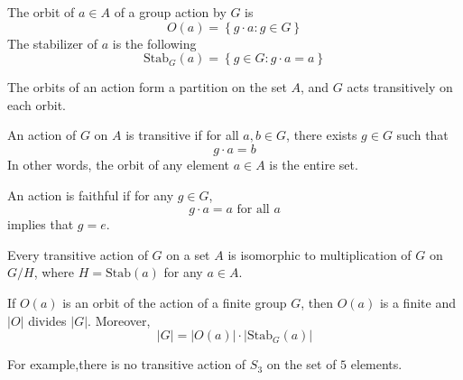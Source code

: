 \documentclass[openany]{book}
\begin{document}
\begin{defn}[orbit]
    The orbit of $a\in A$ of a group action by $G$ is 
    \begin{equation*}
        O(a)=\left\{g\cdot a: g\in G\right\}
    \end{equation*}
    The stabilizer of $a$ is the following 
    \begin{equation*}
        \text{Stab}_G(a)=\left\{g\in G: g\cdot a=a\right\}
    \end{equation*}
\end{defn}

\begin{prop}
    The orbits of an action form a partition on the set $A$, and $G$ acts transitively on each orbit.
\end{prop}

\begin{defn}




    An action of $G$ on $A$ is transitive if for all $a,b\in G$, there exists $g\in G$ such that 
    \begin{equation*}
        g\cdot a=b
    \end{equation*}
    In other words, the orbit of any element $a\in A$ is the entire set.

    An action is faithful if for any $g\in G$, 
    \begin{equation*}
        g\cdot a=a \text{ for all } a
    \end{equation*}
    implies that $g=e$.
\end{defn}



\begin{prop}
    Every transitive action of $G$ on a set $A$ is isomorphic to multiplication of $G$ on $G/H$, where $H=\text{Stab}(a)$ for any $a\in A$.
\end{prop}


\begin{prop}
    If $O(a)$ is an orbit of the action of a finite group $G$, then $O(a)$ is a finite and $|O|$ divides $|G|$. Moreover, 
    \begin{equation*}
        |G|=|O(a)|\cdot|\text{Stab}_G(a)|
    \end{equation*}

    For example,there is no transitive action of $S_3$ on the set of $5$ elements. 
\end{prop}
\end{document}

